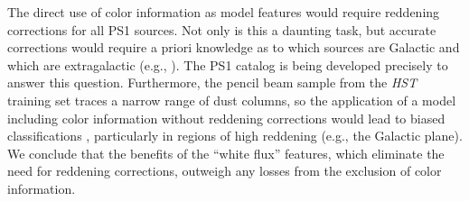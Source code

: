 \documentclass[twocolumn, dvipdfmx]{aastex62}
\begin{document}
\begin{CJK*}{UTF8}{gbsn}
The direct use of color information as model features would require
reddening corrections for all PS1 sources. Not only is this a daunting task,
but accurate corrections would require a priori knowledge as to which
sources are Galactic and which are extragalactic (e.g., \citealt{Green15}).
The PS1 catalog is being developed precisely to answer this question.
Furthermore, the pencil beam sample from the \textit{HST} training set
traces a narrow range of dust columns, so the application of a model
including color information without reddening corrections would lead to
biased classifications \citep{Sevilla18}, particularly in regions of high
reddening (e.g., the Galactic plane). We conclude that the benefits of the
``white flux'' features, which eliminate the need for reddening corrections,
outweigh any losses from the exclusion of color information.


\end{CJK*}
\end{document}
